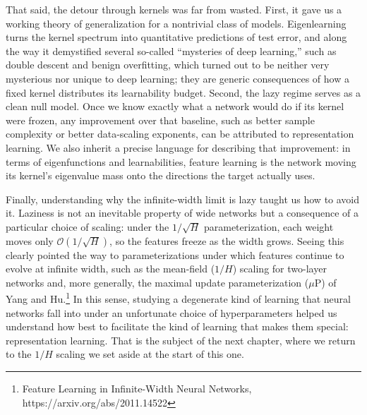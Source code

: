 That said, the detour through kernels was far from wasted. First, it gave us a working theory of generalization for a nontrivial class of models. Eigenlearning turns the kernel spectrum into quantitative predictions of test error, and along the way it demystified several so-called ``mysteries of deep learning,'' such as double descent and benign overfitting, which turned out to be neither very mysterious nor unique to deep learning; they are generic consequences of how a fixed kernel distributes its learnability budget. Second, the lazy regime serves as a clean null model. Once we know exactly what a network would do if its kernel were frozen, any improvement over that baseline, such as better sample complexity or better data-scaling exponents, can be attributed to representation learning. We also inherit a precise language for describing that improvement: in terms of eigenfunctions and learnabilities, feature learning is the network moving its kernel's eigenvalue mass onto the directions the target actually uses.

Finally, understanding why the infinite-width limit is lazy taught us how to avoid it. Laziness is not an inevitable property of wide networks but a consequence of a particular choice of scaling: under the $1/\sqrt{H}$ parameterization, each weight moves only $\mathcal{O}(1/\sqrt{H})$, so the features freeze as the width grows. Seeing this clearly pointed the way to parameterizations under which features continue to evolve at infinite width, such as the mean-field ($1/H$) scaling for two-layer networks and, more generally, the maximal update parameterization ($\mu$P) of Yang and Hu.\footnote{Feature Learning in Infinite-Width Neural Networks, https://arxiv.org/abs/2011.14522} In this sense, studying a degenerate kind of learning that neural networks fall into under an unfortunate choice of hyperparameters helped us understand how best to facilitate the kind of learning that makes them special: representation learning. That is the subject of the next chapter, where we return to the $1/H$ scaling we set aside at the start of this one.
